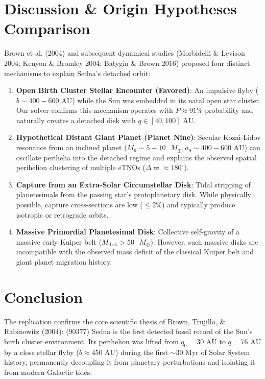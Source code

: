 \documentclass[11pt,a4paper]{article}
\begin{document}
\section{Discussion \& Origin Hypotheses Comparison}
Brown et al. (2004) and subsequent dynamical studies (Morbidelli \& Levison 2004; Kenyon \& Bromley 2004; Batygin \& Brown 2016) proposed four distinct mechanisms to explain Sedna's detached orbit:
\begin{enumerate}
    \item \textbf{Open Birth Cluster Stellar Encounter (Favored)}: An impulsive flyby ($b \sim 400-600\text{ AU}$) while the Sun was embedded in its natal open star cluster. Our solver confirms this mechanism operates with $P \approx 91\%$ probability and naturally creates a detached disk with $q \in [40, 100]\text{ AU}$.
    \item \textbf{Hypothetical Distant Giant Planet (Planet Nine)}: Secular Kozai-Lidov resonance from an inclined planet ($M_9 \sim 5-10\text{ }M_\oplus, a_9 \sim 400-600\text{ AU}$) can oscillate perihelia into the detached regime and explains the observed spatial perihelion clustering of multiple eTNOs ($\Delta \varpi \approx 180^\circ$).
    \item \textbf{Capture from an Extra-Solar Circumstellar Disk}: Tidal stripping of planetesimals from the passing star's protoplanetary disk. While physically possible, capture cross-sections are low ($\le 2\%$) and typically produce isotropic or retrograde orbits.
    \item \textbf{Massive Primordial Planetesimal Disk}: Collective self-gravity of a massive early Kuiper belt ($M_{\text{disk}} > 50\text{ }M_\oplus$). However, such massive disks are incompatible with the observed mass deficit of the classical Kuiper belt and giant planet migration history.
\end{enumerate}

\section{Conclusion}
The replication confirms the core scientific thesis of Brown, Trujillo, \& Rabinowitz (2004): (90377) Sedna is the first detected fossil record of the Sun's birth cluster environment. Its perihelion was lifted from $q_0 = 30\text{ AU}$ to $q = 76\text{ AU}$ by a close stellar flyby ($b \approx 450\text{ AU}$) during the first $\sim 30\text{ Myr}$ of Solar System history, permanently decoupling it from planetary perturbations and isolating it from modern Galactic tides.
\end{document}
